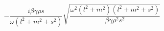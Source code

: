 \documentclass[11pt]{article}
\begin{document}
\doublespacing
\MOONSTITLE
\maketitle

\begin{equation}- \frac{i \beta  \gamma  \rho  s}{\omega  \left(l^{2} + m^{2} + s^{2}\right)} \sqrt{\frac{\omega ^{2} \left(l^{2} + m^{2}\right) \left(l^{2} + m^{2} + s^{2}\right)}{\beta  \gamma  \rho ^{2} s^{2}}}\end{equation}
\end{document}
